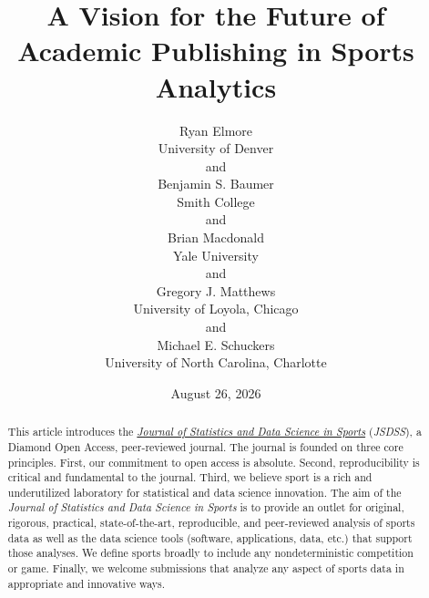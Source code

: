\documentclass[
  12pt]{article}
\begin{document}
\def\spacingset#1{\renewcommand{\baselinestretch}%
{#1}\small\normalsize} \spacingset{1}



\date{August 26, 2026}
\title{\bf A Vision for the Future of Academic Publishing in Sports
Analytics}
\author{
Ryan Elmore\\
University of Denver\\
and\\Benjamin S. Baumer\\
Smith College\\
and\\Brian Macdonald\\
Yale University\\
and\\Gregory J. Matthews\\
University of Loyola, Chicago\\
and\\Michael E. Schuckers\\
University of North Carolina, Charlotte\\
}
\maketitle

\bigskip
\bigskip
\begin{abstract}
This article introduces the
\href{https://jsds-sports.github.io/}{\emph{Journal of Statistics and
Data Science in Sports}} (\emph{JSDSS}), a Diamond Open Access,
peer-reviewed journal. The journal is founded on three core principles.
First, our commitment to open access is absolute. Second,
reproducibility is critical and fundamental to the journal. Third, we
believe sport is a rich and underutilized laboratory for statistical and
data science innovation. The aim of the \emph{Journal of Statistics and
Data Science in Sports} is to provide an outlet for original, rigorous,
practical, state-of-the-art, reproducible, and peer-reviewed analysis of
sports data as well as the data science tools (software, applications,
data, etc.) that support those analyses. We define sports broadly to
include any nondeterministic competition or game. Finally, we welcome
submissions that analyze any aspect of sports data in appropriate and
innovative ways.
\end{abstract}


\newpage
\spacingset{1.9} %
\end{document}
